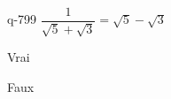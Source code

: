\begin{truefalse}{q-799}
$\dfrac{1}{\sqrt{5}+\sqrt{3}} = \sqrt{5}-\sqrt{3}$
\item Vrai
\item* Faux
\end{truefalse}

